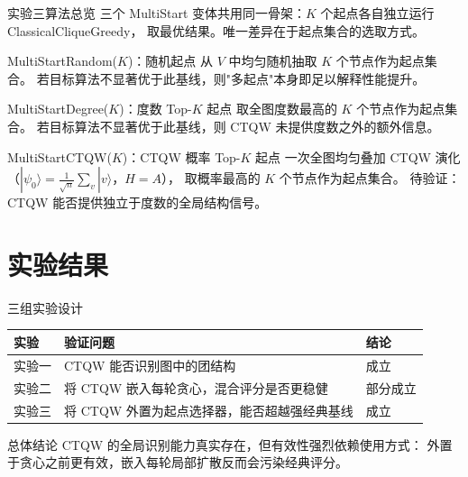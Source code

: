 \documentclass[aspectratio=169,10pt]{ctexbeamer}
\begin{document}
\begin{frame}{实验三算法总览}
  三个 MultiStart 变体共用同一骨架：$K$ 个起点各自独立运行 ClassicalCliqueGreedy，
  取最优结果。唯一差异在于起点集合的选取方式。

  \vspace{0.25em}

  \begin{block}{MultiStartRandom($K$)：随机起点}
    从 $V$ 中均匀随机抽取 $K$ 个节点作为起点集合。
    若目标算法不显著优于此基线，则"多起点"本身即足以解释性能提升。
  \end{block}

  \vspace{0.15em}

  \begin{block}{MultiStartDegree($K$)：度数 Top-$K$ 起点}
    取全图度数最高的 $K$ 个节点作为起点集合。
    若目标算法不显著优于此基线，则 CTQW 未提供度数之外的额外信息。
  \end{block}

  \vspace{0.15em}

  \begin{alertblock}{MultiStartCTQW($K$)：CTQW 概率 Top-$K$ 起点}
    一次全图均匀叠加 CTQW 演化（$|\psi_0\rangle{=}\frac{1}{\sqrt{n}}\sum_v|v\rangle$，$H{=}A$），
    取概率最高的 $K$ 个节点作为起点集合。
    待验证：CTQW 能否提供独立于度数的全局结构信号。
  \end{alertblock}
\end{frame}

\section{实验结果}

\begin{frame}{三组实验设计}
  \centering
  \renewcommand{\arraystretch}{1.25}
  \begin{tabular}{p{}p{}p{}}
    \toprule
    实验 & 验证问题 & 结论 \\
    \midrule
    实验一 & CTQW 能否识别图中的团结构 & 成立 \\
    实验二 & 将 CTQW 嵌入每轮贪心，混合评分是否更稳健 & 部分成立 \\
    实验三 & 将 CTQW 外置为起点选择器，能否超越强经典基线 & 成立 \\
    \bottomrule
  \end{tabular}

  \vspace{1.5em}
  \begin{block}{总体结论}
    CTQW 的全局识别能力真实存在，但有效性强烈依赖使用方式：
    外置于贪心之前更有效，嵌入每轮局部扩散反而会污染经典评分。
  \end{block}
\end{frame}
\end{document}
